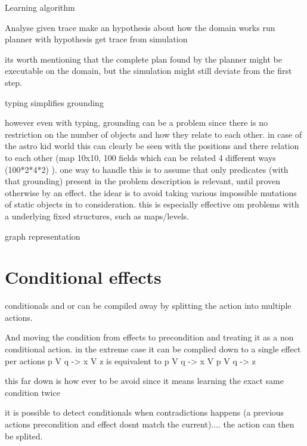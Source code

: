 	\begin{algorithm}
		\caption{Learning algorithm}
		\label{mainAlgo}
		\begin{algorithmic}[1]
			\State Analyse given trace
			\State make an hypothesis about how the domain works
			\State run planner with hypothesis
			\State get trace from simulation
			\EndWhile
			
		\end{algorithmic}
	\end{algorithm}	
	its worth mentioning that the complete plan found by the planner might be executable on the domain, but the simulation might still deviate from the first step.
	
			
	
	typing simplifies grounding
	
	however even with typing, grounding can be a problem since there is no restriction on the number of objects and how they relate to each other. in case of the astro kid world this can clearly be seen with the positions and there relation to each other (map 10x10, 100 fields which can be related 4 different ways (100*2*4*2) ).
	one way to handle this is to assume that only predicates (with that grounding) present in the problem description is relevant, until proven otherwise by an effect. the idear is to avoid taking various impossible mutations of static objects in to consideration. this is especially effective om problems with a underlying fixed structures, such as maps/levels.
		

	graph representation

\section{Conditional effects}	



	
	
	conditionals and or can be compiled away by splitting the action into multiple actions.

	And moving the condition from effects to precondition and treating it as a non conditional action.	in the extreme case it can be complied down to a single effect per actions 
	p V q -> x V z
	is equivalent to 
	p V q -> x
	V
	p V q -> z
	
	this far down is how ever to be avoid since it means learning the exact same condition twice
	
	 it is possible to detect conditionals when contradictions happens (a previous actions precondition and effect dosnt match the current).... the action can then be splited. %
	
